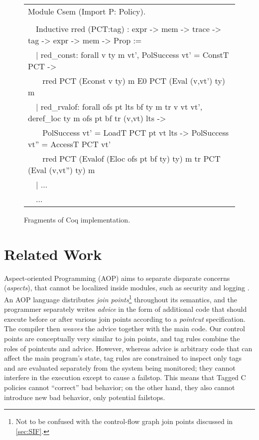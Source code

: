 \documentclass{llncs}
\begin{document}
\begin{figure}[t]
{    \begin{tabular}{l}
      Module Csem (Import P: Policy). \\
      \\
      \ \ Inductive rred (PCT:tag) : expr -> mem -> trace -> tag -> expr -> mem -> Prop := \\
      \ \ | red\_const: forall v ty m vt', PolSuccess vt' = ConstT PCT -> \\
      \ \ ~ rred PCT (Econst v ty) m E0 PCT (Eval (v,vt') ty) m \\
      \ \ | red\_rvalof: forall ofs pt lts bf ty m tr v vt vt', deref\_loc ty m ofs pt bf tr (v,vt) lts -> \\
      \ \ ~ PolSuccess vt' = LoadT PCT pt vt lts -> PolSuccess vt'' = AccessT PCT vt' \\
      \ \ ~ rred PCT (Evalof (Eloc ofs pt bf ty) ty) m tr PCT (Eval (v,vt'') ty) m \\
      \ \ | ...\\
      \ \ ...
      \end{tabular} }
    
  \caption{Fragments of Coq implementation.}
  \label{fig:fullcode}
\end{figure}

\section{Related Work}
\label{sec:related}

Aspect-oriented Programming (AOP) aims to separate disparate concerns ({\em aspects}),
that cannot be localized inside modules, such as security and logging \cite{Kiczales97:AOP}. %
An AOP language distributes {\em join points}\footnote{Not to be confused with the control-flow graph
join points discussed in \cref{sec:SIF}.} throughout its semantics, 
and the programmer separately writes {\em advice} in the form of
additional code that should execute before or after various join points according to
a {\em pointcut} specification. The compiler
then {\em weaves} the advice together with the main code. 
Our control points are conceptually very similar to join points, 
and tag rules combine the roles of pointcuts and advice.
However, whereas advice is arbitrary code that can affect the main program's state,
tag rules are constrained to inspect only tags and are evaluated separately
from the system being monitored; they cannot interfere in the execution except to cause a failstop.
This means that
Tagged C policies cannot ``correct'' bad behavior; on the other hand, they also cannot introduce
new bad behavior, only potential failstops. 
\end{document}
